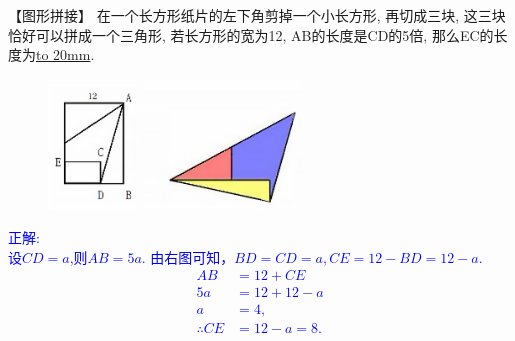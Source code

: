 \item {
    【图形拼接】
    在一个长方形纸片的左下角剪掉一个小长方形, 再切成三块,  这三块恰好可以拼成一个三角形, 若长方形的宽为12, AB的长度是CD的5倍, 那么EC的长度为\underline{\hbox to 20mm{}}.
    \begin{figure}[H] 
        \centering
        \includegraphics[width=0.6\textwidth]{./pics/Chapter_2/6.png}
    \end{figure}
    \ifshowSolution 
        \fangsong{}\textcolor{blue}{
            正解: \\
            设$CD=a$,则$AB=5a$.
            由右图可知，$BD=CD=a, CE = 12-BD = 12-a$.\\
            \begin{align*}
                AB &= 12+CE \\
                5a &= 12 + 12-a\\
                a &= 4,\\
                \therefore CE &= 12-a=8.
            \end{align*}
        }
    \else
        \vspace{1cm}
    \fi
}

